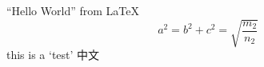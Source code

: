 \documentclass{ctexart}
\begin{document}
``Hello World'' from \LaTeX
\begin{equation}
    a^2 = b^2+c^2=\sqrt{\frac{m_2}{n_2}}
\end{equation}
this is a `test' 中文
\end{document}
